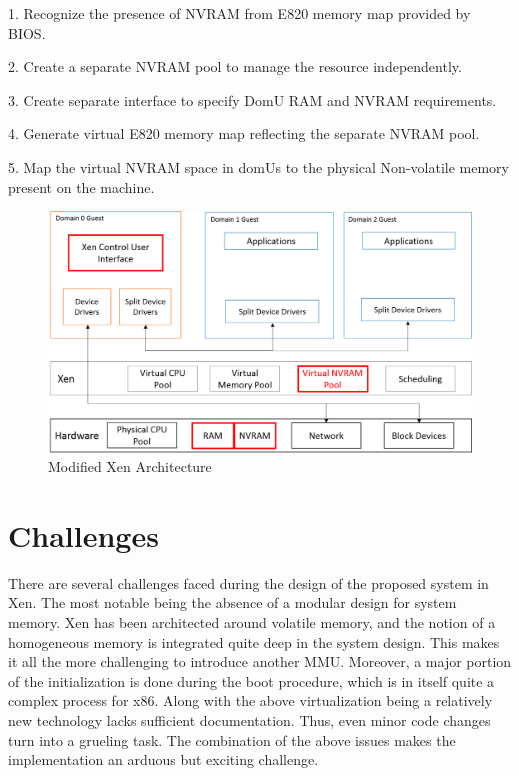 1. Recognize the presence of NVRAM from E820 memory map provided by BIOS.

2. Create a separate NVRAM pool to manage the resource independently.

3. Create separate interface to specify DomU RAM and NVRAM requirements.

4. Generate virtual E820 memory map reflecting the separate NVRAM pool.

5. Map the virtual NVRAM space in domUs to the physical Non-volatile memory present on the machine. 

\begin{figure}[H]
\centering
\includegraphics[scale=0.6]{figures/Xen_mod_model.png}
\caption{Modified Xen Architecture}
\label{fig:xen_mod}
\end{figure}

\section{Challenges}

There are several challenges faced during the design of the proposed system in Xen. The most notable being the absence of a modular design for system memory. Xen has been architected around volatile memory, and the notion of a homogeneous memory is integrated quite deep in the system design. This makes it all the more challenging to introduce another MMU. Moreover, a major portion of the initialization is done during the boot procedure, which is in itself quite a complex process for x86. Along with the above virtualization being a relatively new technology lacks sufficient documentation. Thus, even minor code changes turn into a grueling task. The combination of the above issues makes the implementation an arduous but exciting challenge. 



